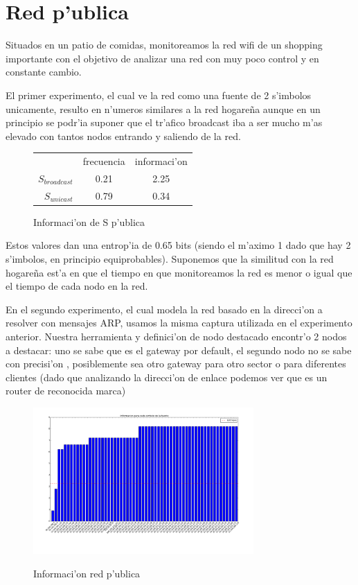 \section{Red p'ublica}
Situados en un patio de comidas, monitoreamos la red wifi de un shopping importante con el objetivo de analizar una red
con muy poco control y en constante cambio.

El primer experimento, el cual ve la red como una fuente de 2 s'imbolos unicamente, resulto en n'umeros similares a la red hogare\~na 
aunque en un principio se podr'ia suponer que el tr'afico broadcast iba a ser mucho m'as elevado con tantos nodos entrando y saliendo
de la red. 

\begin{figure}[!h]
\centering
\caption{Informaci'on de S p'ublica}
\begin{tabular}{ r|c|c| }
\multicolumn{1}{r}{}
 &  \multicolumn{1}{c}{frecuencia}
 & \multicolumn{1}{c}{informaci'on} \\
\cline{2-3}
$S_{broadcast}$ & 0.21 & 2.25 \\
\cline{2-3}
$S_{unicast}$ & 0.79 & 0.34 \\
\cline{2-3}
\end{tabular}
\end{figure}
 
Estos valores dan una entrop'ia de 0.65 bits (siendo el m'aximo 1 dado que hay 2 s'imbolos, en principio equiprobables). Suponemos
que la similitud con la red hogare\~na est'a en que el tiempo en que monitoreamos la red es menor o igual que el tiempo de cada nodo en la
red.
 
En el segundo experimento, el cual modela la red basado en la direcci'on a resolver con mensajes ARP, usamos la misma captura
utilizada en el experimento anterior. Nuestra herramienta y definici'on de nodo destacado encontr'o 2 nodos a destacar: uno se sabe que es el 
gateway por default, el segundo nodo no se sabe con precisi'on , posiblemente sea otro gateway para otro sector o para diferentes clientes (dado
que analizando la direcci'on de enlace podemos ver que es un router de reconocida marca)
 
\begin{figure}[!h]
\centering
\caption{Informaci'on red p'ublica}
\includegraphics[width=0.75\textwidth]{red3_info}
 \label{fig:red3info}
\end{figure}

